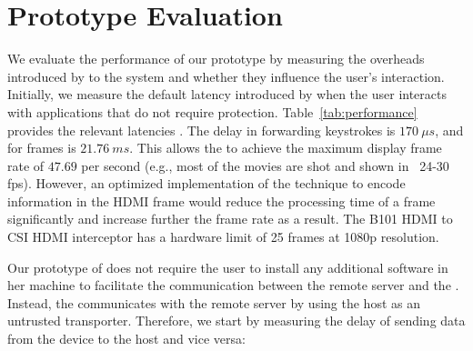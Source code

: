 

\section{Prototype Evaluation}
\label{sec:eval}



We evaluate the performance of our prototype by measuring the overheads introduced by \name to the system and whether they influence the user's interaction. Initially, we measure the default latency introduced by \device when the user interacts with applications that do not require protection. Table~\ref{tab:performance} provides the relevant latencies .
The delay in forwarding keystrokes is $170\ \mu s$, and for frames is $21.76\ ms$. This allows the \device to achieve the maximum display frame rate of $47.69$ per second (e.g., most of the movies are shot and shown in  ~24-30 fps). However, an optimized implementation of the technique to encode information in the HDMI frame would reduce the processing time of a frame significantly and increase further the frame rate as a result. The B101 HDMI to CSI HDMI interceptor has a hardware limit of 25 frames at 1080p resolution. 

Our prototype of \name does not require the user to install any additional software in her machine to facilitate the communication between the remote server and the \device. Instead, the \device communicates with the remote server by using the host as an untrusted transporter. Therefore, we start by measuring the delay of sending data from the device to the host and vice versa:


